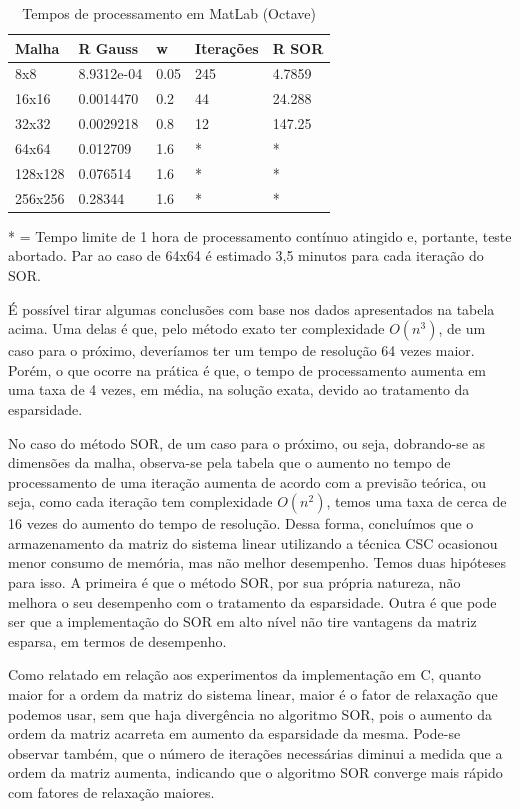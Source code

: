 \documentclass[
	article,			%
	11pt,				%
	oneside,			%
	a4paper,			%
	english,			%
	brazil,				%
	sumario=tradicional
	]{abntex2}
\begin{document}
\begin{table}[!h]
\centering
\caption{Tempos de processamento em MatLab (Octave)}
\label{my-label}
\begin{tabular}{|l|l|l|l|l|}
\hline
Malha   & R Gauss & {w} & Iterações & R SOR \\ \hline
8x8     & 8.9312e-04 & 0.05 & 245 & 4.7859 \\ \hline
16x16   & 0.0014470 & 0.2 & 44 & 24.288  \\ \hline
32x32   & 0.0029218 & 0.8 & 12 & 147.25  \\ \hline
64x64   & 0.012709 & 1.6 & * & *  \\ \hline
128x128 & 0.076514 & 1.6 & * & * \\ \hline
256x256 & 0.28344 & 1.6 & * & * \\ \hline
\end{tabular}
\end{table}

* = Tempo limite de 1 hora de processamento contínuo atingido e, portante, teste abortado. Par ao caso de 64x64 é estimado 3,5 minutos para cada iteração do SOR.

É possível tirar algumas conclusões com base nos dados apresentados na tabela acima. Uma delas é que, pelo método exato ter 
complexidade $ O(n^3) $, de um caso para o próximo, deveríamos ter um tempo de resolução 64 vezes maior. Porém, o que ocorre na
prática é que, o tempo de processamento aumenta em uma taxa de 4 vezes, em média, na solução exata, devido ao tratamento da
esparsidade.

No caso do método SOR, de um caso para o próximo, ou seja, dobrando-se as dimensões da malha, observa-se pela tabela que o
aumento no tempo de processamento de uma iteração aumenta de acordo com a previsão teórica, ou seja, como cada iteração tem
complexidade $ O(n^2) $, temos uma taxa de cerca de 16 vezes do aumento do tempo de resolução. Dessa forma, concluímos que
o armazenamento da matriz do sistema linear utilizando a técnica CSC ocasionou menor consumo de memória, mas não melhor desempenho.
Temos duas hipóteses para isso. A primeira é que o método SOR, por sua própria natureza, não melhora o seu desempenho com o tratamento
da esparsidade. Outra é que pode ser que a implementação do SOR em alto nível não tire vantagens da matriz esparsa, em termos
de desempenho.

Como relatado em relação aos experimentos da implementação em C, quanto maior for a ordem da matriz do sistema linear, maior
é o fator de relaxação que podemos usar, sem que haja divergência no algoritmo SOR, pois o aumento da ordem da matriz acarreta
em aumento da esparsidade da mesma. Pode-se observar também, que o número de iterações necessárias diminui a medida que a ordem
da matriz aumenta, indicando que o algoritmo SOR converge mais rápido com fatores de relaxação maiores.
\end{document}
